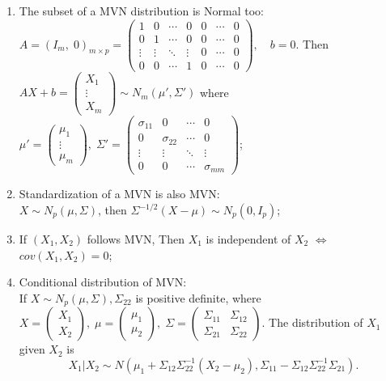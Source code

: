\documentclass[12pt]{book}
\theoremstyle{definition}
\theoremstyle{remark}
\begin{document}
\begin{enumerate}
\item The subset of a MVN distribution is Normal too:\\
$A = (I_m,\; 0)_{m\times p} = \begin{pmatrix}  
  1 & 0 & \cdots & 0 &0&\cdots&0\\  
  0 & 1 & \cdots & 0 &0&\cdots&0\\  
  \vdots & \vdots & \ddots & \vdots &0&\cdots&0\\  
  0 & 0 & \cdots & 1&0&\cdots&0 
\end{pmatrix},\quad b = 0.$ Then $AX+b = \begin{pmatrix}
X_1 \\
\vdots \\
X_m
\end{pmatrix}\sim N_m(\mu', \Sigma')$ where $\mu' = \begin{pmatrix}
\mu_1 \\
\vdots \\
\mu_m
\end{pmatrix},\; \Sigma' = \begin{pmatrix}  
  \sigma_{11} & 0 & \cdots & 0 \\  
  0 & \sigma_{22} & \cdots & 0 \\  
  \vdots & \vdots & \ddots & \vdots \\  
  0 & 0 & \cdots & \sigma_{mm}  
\end{pmatrix} $;
\item Standardization of a MVN is also MVN:\\
$X\sim N_p(\mu, \Sigma)$, then $\Sigma^{-1/2}(X-\mu)\sim N_p(0,I_p)$;
\item If $(X_1, X_2)$ follows MVN, Then $X_1$ is independent of $X_2$ $\Leftrightarrow$ $cov(X_1, X_2) = 0$;
\item Conditional distribution of MVN:\\
If $X\sim N_p(\mu, \Sigma), \Sigma_{22}$ is positive definite, where $X = \begin{pmatrix}
X_1 \\
X_2
\end{pmatrix},\; \mu = \begin{pmatrix}
\mu_1 \\
\mu_2
\end{pmatrix},\;\Sigma = \begin{pmatrix}  
  \Sigma_{11} & \Sigma_{12} \\  
  \Sigma_{21}& \Sigma_{22} 
\end{pmatrix}$. The distribution of $X_1$ given $X_2$ is 
\[X_1|X_2 \sim N(\mu_1+\Sigma_{12}\Sigma_{22}^{-1}(X_2-\mu_2), \Sigma_{11} - \Sigma_{12}\Sigma_{22}^{-1}\Sigma_{21}).\]
\end{enumerate}
\end{document}
